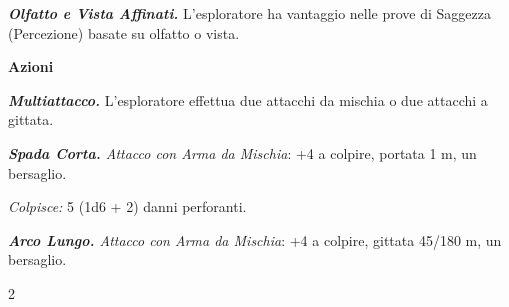 \begin{multicols}{2}
\emph{\textbf{Olfatto e Vista Affinati.}} L'esploratore ha vantaggio
nelle prove di Saggezza (Percezione) basate su olfatto o vista.

\smallskip\textbf{Azioni}

\emph{\textbf{Multiattacco.}} L'esploratore effettua due attacchi da
mischia o due attacchi a gittata.

\emph{\textbf{Spada Corta.} Attacco con Arma da Mischia}: +4 a colpire,
portata 1 m, un bersaglio.

\emph{Colpisce:} 5 (1d6 + 2) danni perforanti.

\emph{\textbf{Arco Lungo.} Attacco con Arma da Mischia}: +4 a colpire,
gittata 45/180 m, un bersaglio.

\end{multicols}{2}
